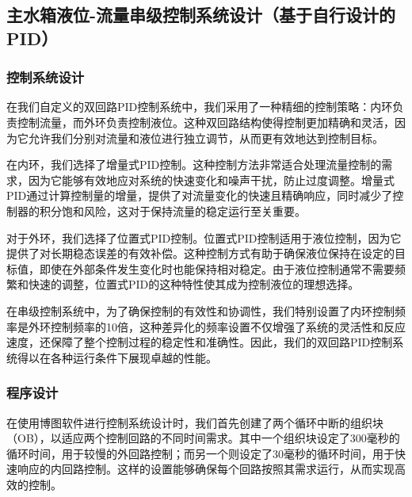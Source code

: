 \documentclass[UTF8]{article}
\begin{document}
\subsection{主水箱液位-流量串级控制系统设计（基于自行设计的PID）}
\subsubsection{控制系统设计}
在我们自定义的双回路PID控制系统中，我们采用了一种精细的控制策略：内环负责控制流量，而外环负责控制液位。这种双回路结构使得控制更加精确和灵活，因为它允许我们分别对流量和液位进行独立调节，从而更有效地达到控制目标。

在内环，我们选择了增量式PID控制。这种控制方法非常适合处理流量控制的需求，因为它能够有效地应对系统的快速变化和噪声干扰，防止过度调整。增量式PID通过计算控制量的增量，提供了对流量变化的快速且精确响应，同时减少了控制器的积分饱和风险，这对于保持流量的稳定运行至关重要。

对于外环，我们选择了位置式PID控制。位置式PID控制适用于液位控制，因为它提供了对长期稳态误差的有效补偿。这种控制方式有助于确保液位保持在设定的目标值，即使在外部条件发生变化时也能保持相对稳定。由于液位控制通常不需要频繁和快速的调整，位置式PID的这种特性使其成为控制液位的理想选择。

在串级控制系统中，为了确保控制的有效性和协调性，我们特别设置了内环控制频率是外环控制频率的10倍，这种差异化的频率设置不仅增强了系统的灵活性和反应速度，还保障了整个控制过程的稳定性和准确性。因此，我们的双回路PID控制系统得以在各种运行条件下展现卓越的性能。

\subsubsection{程序设计}
在使用博图软件进行控制系统设计时，我们首先创建了两个循环中断的组织块（OB），以适应两个控制回路的不同时间需求。其中一个组织块设定了300毫秒的循环时间，用于较慢的外回路控制；而另一个则设定了30毫秒的循环时间，用于快速响应的内回路控制。这样的设置能够确保每个回路按照其需求运行，从而实现高效的控制。
\end{document}

